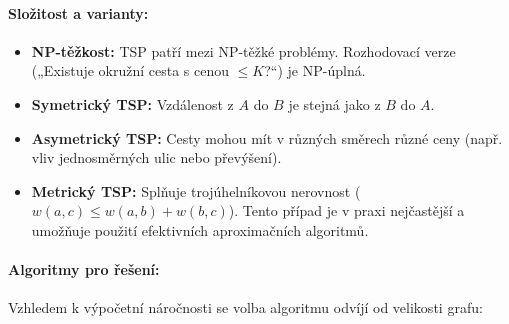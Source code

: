 \paragraph*{Složitost a varianty:}
\begin{itemize}
    \item \textbf{NP-těžkost:} TSP patří mezi NP-těžké problémy. Rozhodovací verze („Existuje okružní cesta s cenou $\leq K$?“) je NP-úplná.
    \item \textbf{Symetrický TSP:} Vzdálenost z $A$ do $B$ je stejná jako z $B$ do $A$.
    \item \textbf{Asymetrický TSP:} Cesty mohou mít v různých směrech různé ceny (např. vliv jednosměrných ulic nebo převýšení).
    \item \textbf{Metrický TSP:} Splňuje trojúhelníkovou nerovnost ($w(a,c) \leq w(a,b) + w(b,c)$). Tento případ je v praxi nejčastější a umožňuje použití efektivních aproximačních algoritmů.
\end{itemize}

\paragraph*{Algoritmy pro řešení:}
Vzhledem k výpočetní náročnosti se volba algoritmu odvíjí od velikosti grafu:

